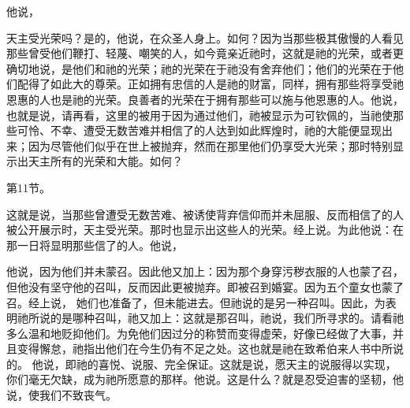 他说，\par

天主受光荣吗？是的，他说，在众圣人身上。如何？因为当那些极其傲慢的人看见那些曾受他们鞭打、轻蔑、嘲笑的人，如今竟亲近祂时，这就是祂的光荣，或者更确切地说，是他们和祂的光荣；祂的光荣在于祂没有舍弃他们；他们的光荣在于他们配得了如此大的尊荣。正如拥有忠信的人是祂的财富，同样，拥有那些将享受祂恩惠的人也是祂的光荣。良善者的光荣在于拥有那些可以施与他恩惠的人。他说，也就是说，请再看，这里的被用于因为通过他们，祂被显示为可钦佩的，当祂使那些可怜、不幸、遭受无数苦难并相信了的人达到如此辉煌时，祂的大能便显现出来；因为尽管他们似乎在世上被抛弃，然而在那里他们仍享受大光荣；那时特别显示出天主所有的光荣和大能。如何？\par

\par

第11节。 \par

这就是说，当那些曾遭受无数苦难、被诱使背弃信仰而并未屈服、反而相信了的人被公开展示时，天主受光荣。那时也显示出这些人的光荣。经上说。为此他说：在那一日将显明那些信了的人。他说，\par

他说，因为他们并未蒙召。因此他又加上：因为那个身穿污秽衣服的人也蒙了召，但他没有坚守他的召叫，反而因此更被抛弃。即被召到婚宴。因为五个童女也蒙了召。经上说， 她们也准备了，但未能进去。但祂说的是另一种召叫。因此，为表明祂所说的是哪种召叫，祂又加上：这就是那召叫，祂说，我们所寻求的。请看祂多么温和地贬抑他们。为免他们因过分的称赞而变得虚荣，好像已经做了大事，并且变得懈怠，祂指出他们在今生仍有不足之处。这也就是祂在致希伯来人书中所说的。  他说，即祂的喜悦、说服、完全保证。这就是说，愿天主的说服得以实现，你们毫无欠缺，成为祂所愿意的那样。他说。这是什么？就是忍受迫害的坚韧，他说，使我们不致丧气。\par

